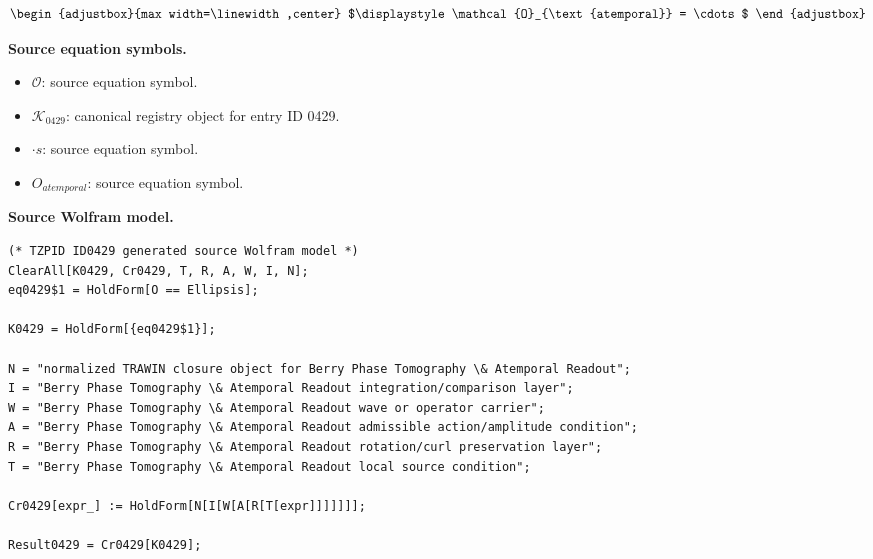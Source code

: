 \[
\begin{adjustbox}{max width=\linewidth,center}
$\displaystyle
\mathcal{O}_{\text{atemporal}} = \cdots
$
\end{adjustbox}
\]

\begin{minipage}[t]{0.49\linewidth}
\begingroup
\small
\raggedright
\textbf{Source equation symbols.}\par
\begin{itemize}[leftmargin=1.35em,itemsep=1pt,topsep=1pt,parsep=0pt]
    \item $\mathcal{O}$: source equation symbol.
    \item $\mathcal{K}_{0429}$: canonical registry object for entry ID 0429.
    \item $\cdot s$: source equation symbol.
    \item $O_{atemporal}$: source equation symbol.
\end{itemize}
\endgroup
\end{minipage}\hfill
\begin{minipage}[t]{0.47\linewidth}
\begingroup
\scriptsize
\raggedright
\textbf{Source Wolfram model.}\par
\begin{Verbatim}[fontsize=\tiny,breaklines=true,breakanywhere=true]
(* TZPID ID0429 generated source Wolfram model *)
ClearAll[K0429, Cr0429, T, R, A, W, I, N];
eq0429$1 = HoldForm[O == Ellipsis];

K0429 = HoldForm[{eq0429$1}];

N = "normalized TRAWIN closure object for Berry Phase Tomography \& Atemporal Readout";
I = "Berry Phase Tomography \& Atemporal Readout integration/comparison layer";
W = "Berry Phase Tomography \& Atemporal Readout wave or operator carrier";
A = "Berry Phase Tomography \& Atemporal Readout admissible action/amplitude condition";
R = "Berry Phase Tomography \& Atemporal Readout rotation/curl preservation layer";
T = "Berry Phase Tomography \& Atemporal Readout local source condition";

Cr0429[expr_] := HoldForm[N[I[W[A[R[T[expr]]]]]]];

Result0429 = Cr0429[K0429];
\end{Verbatim}
\endgroup
\end{minipage}

